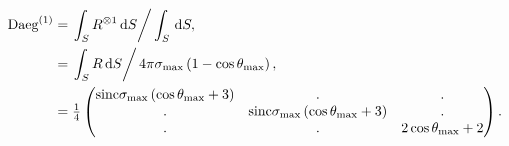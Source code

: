 \documentclass[a4paper,11pt,twoside,openright]{book}
\providecommand{\sinc}{{\mathrm{sinc}}}%
\def\lthtmlcheckvsize{\ifdim\ht\sizebox<\vsize 
  \ifdim\wd\sizebox<\hsize\expandafter\hfill\fi \expandafter\vfill
  \else\expandafter\vss\fi}%
\begin{document}
{\newpage\clearpage
\setcounter{equation}{24}
%
\begin{subequations}\begin{align}
\textrm{Daeg}^{(1)}&= \left. \int_S R^{\otimes 1} \,\mathrm{d}S \right / \int_S \,\mathrm{d}S , \\
&= \left. \int_S R \,\mathrm{d}S \right / 4\pi \sigma_{\textrm{max}}\left( 1 - \cos\theta_{\textrm{max}}\right) , \\
&= \tfrac{1}{4}\begin{pmatrix}
\sinc \sigma_{\textrm{max}}\left( \cos\theta_{\textrm{max}}+ 3 \right) & .                                                   & . \\
.                                                   & \sinc \sigma_{\textrm{max}}\left( \cos\theta_{\textrm{max}}+ 3 \right) & . \\
.                                                   & .                                                   & 2\cos\theta_{\textrm{max}}+ 2 \\
\end{pmatrix} .
\end{align}\end{subequations}%
\lthtmldisplayZ
\lthtmlcheckvsize\clearpage}
\end{document}
